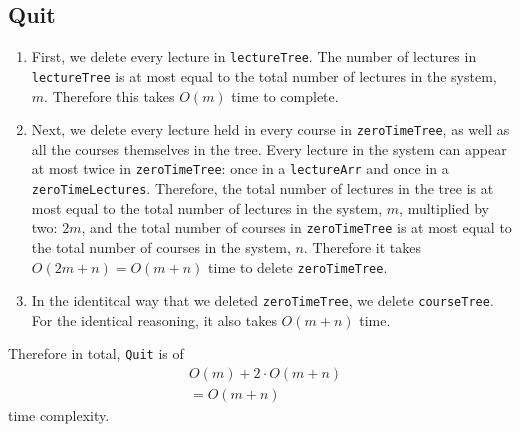 \documentclass{article}
\begin{document}
    \subsection*{Quit}
        \begin{enumerate}
            \item First, we delete every lecture in \texttt{lectureTree}. The number of lectures in \texttt{lectureTree}
                is at most equal to the total number of lectures in the system, $m$. Therefore this takes $O(m)$ time
                to complete.
            \item Next, we delete every lecture held in every course in \texttt{zeroTimeTree},
                as well as all the courses themselves in the tree. Every lecture in the system can appear at most 
                twice in \texttt{zeroTimeTree}: once in a \texttt{lectureArr} and once in a \texttt{zeroTimeLectures}.
                Therefore, the total number of lectures in the tree is at most equal to the total number of lectures in the system, $m$,
                multiplied by two: $2m$, and the total number of courses
                in \texttt{zeroTimeTree} is at most equal to the total number of courses in the system, $n$.
                Therefore it takes $O(2m+n)=O(m+n)$ time to delete \texttt{zeroTimeTree}.
            \item In the identitcal way that we deleted \texttt{zeroTimeTree}, we delete \texttt{courseTree}.
                For the identical reasoning, it also takes $O(m+n)$ time.
        \end{enumerate}
    Therefore in total, \texttt{Quit} is of 
     \begin{align*}
         &O(m)+2\cdot O(m+n)\\
         &=O(m+n)
     \end{align*}
     time complexity.
\end{document}
